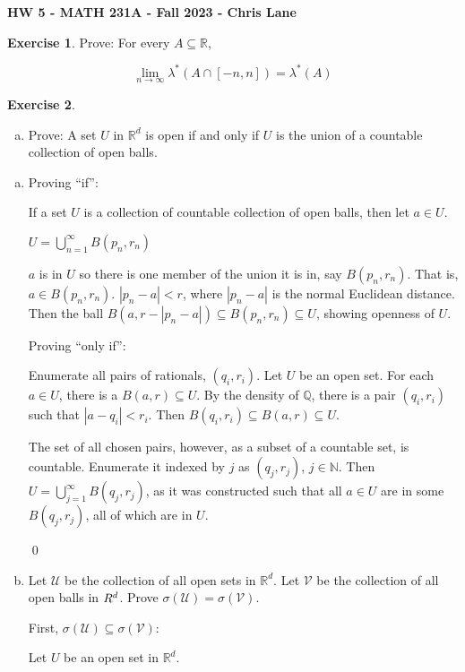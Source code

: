 \documentclass[11pt,oneside]{article}
\numberwithin{equation}{section}
\theoremstyle{definition}
\newtheorem{exercise}{Exercise}
\def\RR{\mathbb{R}}
\def\QQ{\mathbb{Q}}
\def\NN{\mathbb{N}}
\def\fancyU{\mathscr{U}}
\def\fancyV{\mathscr{V}}
\begin{document}
\textbf{HW 5 - MATH 231A - Fall 2023 - Chris Lane}

\begin{exercise}
  Prove: For every $A \subseteq \RR$,

  $$
  \lim \limits _{n \to \infty} \lambda ^*(A \cap [-n, n]) = \lambda^*(A)
  $$

\end{exercise}
\begin{solution}
\end{solution}

\begin{exercise}
  \begin{enumerate}[(a)]
  \item
    Prove: A set $U$ in $\RR ^ d$ is open if and only if $U$ is the union of a countable collection of open balls.  
  \end{enumerate}
\end{exercise}
\begin{solution}
  \begin{enumerate}[(a)]
  \item
    Proving ``if'':

    If a set $U$ is a collection of countable collection of open balls, then let
    $a \in U$.

    $U = \bigcup \limits _{n=1} ^ {\infty} B(p_n, r_n)$

    $a$ is in $U$ so there is one member of the union it is in, say
    $B(p_n, r_n)$.  That is, $ a \in B(p_n, r_n)$.  $|p_n - a| < r$,
    where $| p_n - a| $ is the normal Euclidean distance.  Then the
    ball $B(a, r - |p_n - a|) \subseteq B(p_n, r_n) \subseteq U$,
    showing openness of $U$.

    Proving ``only if'':

    Enumerate all pairs of rationals, $(q_i, r_i)$.  Let $U$ be an
    open set.  For each $a \in U$, there is a $B(a, r) \subseteq U$.
    By the density of $\QQ$, there is a pair $(q_i, r_i)$ such that
    $|a-q_i| < r_i$. Then $B(q_i, r_i) \subseteq B(a, r) \subseteq U$.  

    The set of all chosen pairs, however, as a subset of a countable
    set, is countable. Enumerate it indexed by $j$ as $(q_j, r_j)$,
    $j \in \NN$.  Then $U = \bigcup \limits _{j=1} ^ \infty B(q_j,
    r_j)$, as it was constructed such that all $a \in U$ are in some
    $B(q_j, r_j)$, all of which are in $U$.

    \qed
  \item
    Let $\fancyU$ be the collection of all open sets in $\RR^d$. Let
    $\fancyV$ be the collection of all open balls in $\\R^d$.  Prove
    $\sigma(\fancyU) = \sigma(\fancyV)$.

    First, $\sigma(\fancyU) \subseteq \sigma(\fancyV)$:

    Let $U$ be an open set in $\RR^d$.  

    

    
  \end{enumerate}
\end{solution}
\end{document}

